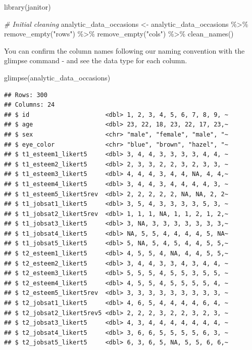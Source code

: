 \documentclass[
]{krantz}
\makeatletter
\newenvironment{Shaded}{\begin{snugshade}}{\end{snugshade}}
\newcommand{\CommentTok}[1]{\textcolor[rgb]{0.37,0.37,0.37}{\textit{#1}}}
\newcommand{\FunctionTok}[1]{\textcolor[rgb]{0,0,0}{#1}}
\newcommand{\NormalTok}[1]{#1}
\newcommand{\OtherTok}[1]{\textcolor[rgb]{0.37,0.37,0.37}{#1}}
\newcommand{\SpecialCharTok}[1]{\textcolor[rgb]{0,0,0}{#1}}
\newcommand{\StringTok}[1]{\textcolor[rgb]{0.5,0.5,0.5}{#1}}
\newenvironment{kframe}{%
\medskip{}
\setlength{\fboxsep}{.8em}
 \def\at@end@of@kframe{}%
 \ifinner\ifhmode%
  \def\at@end@of@kframe{\end{minipage}}%
  \begin{minipage}{\columnwidth}%
 \fi\fi%
 \def\FrameCommand##1{\hskip\@totalleftmargin \hskip-\fboxsep
 \colorbox{shadecolor}{##1}\hskip-\fboxsep
     \hskip-\linewidth \hskip-\@totalleftmargin \hskip\columnwidth}%
 \MakeFramed {\advance\hsize-\width
   \@totalleftmargin\z@ \linewidth\hsize
   \@setminipage}}%
 {\par\unskip\endMakeFramed%
 \at@end@of@kframe}
\renewenvironment{Shaded}{\begin{kframe}}{\end{kframe}}
\makeatother
\begin{document}
\begin{Shaded}
\begin{Highlighting}[]
\FunctionTok{library}\NormalTok{(janitor)}

\CommentTok{\# Initial cleaning}
\NormalTok{analytic\_data\_occasions }\OtherTok{\textless{}{-}}\NormalTok{ analytic\_data\_occasions }\SpecialCharTok{\%\textgreater{}\%}
  \FunctionTok{remove\_empty}\NormalTok{(}\StringTok{"rows"}\NormalTok{) }\SpecialCharTok{\%\textgreater{}\%}
  \FunctionTok{remove\_empty}\NormalTok{(}\StringTok{"cols"}\NormalTok{) }\SpecialCharTok{\%\textgreater{}\%}
  \FunctionTok{clean\_names}\NormalTok{()}
\end{Highlighting}
\end{Shaded}

You can confirm the column names following our naming convention with the glimpse command - and see the data type for each column.

\begin{Shaded}
\begin{Highlighting}[]
\FunctionTok{glimpse}\NormalTok{(analytic\_data\_occasions)}
\end{Highlighting}
\end{Shaded}

\begin{verbatim}
## Rows: 300
## Columns: 24
## $ id                     <dbl> 1, 2, 3, 4, 5, 6, 7, 8, 9, ~
## $ age                    <dbl> 23, 22, 18, 23, 22, 17, 23,~
## $ sex                    <chr> "male", "female", "male", "~
## $ eye_color              <chr> "blue", "brown", "hazel", "~
## $ t1_esteem1_likert5     <dbl> 3, 4, 4, 3, 3, 3, 3, 4, 4, ~
## $ t1_esteem2_likert5     <dbl> 2, 3, 3, 2, 2, 3, 2, 3, 3, ~
## $ t1_esteem3_likert5     <dbl> 4, 4, 4, 3, 4, 4, NA, 4, 4,~
## $ t1_esteem4_likert5     <dbl> 3, 4, 4, 3, 4, 4, 4, 4, 3, ~
## $ t1_esteem5_likert5rev  <dbl> 2, 2, 2, 2, 2, NA, NA, 2, 2~
## $ t1_jobsat1_likert5     <dbl> 3, 5, 4, 3, 3, 3, 3, 5, 3, ~
## $ t1_jobsat2_likert5rev  <dbl> 1, 1, 1, NA, 1, 1, 2, 1, 2,~
## $ t1_jobsat3_likert5     <dbl> 3, NA, 3, 3, 3, 3, 3, 3, 3,~
## $ t1_jobsat4_likert5     <dbl> NA, 5, 5, 4, 4, 4, 4, 5, NA~
## $ t1_jobsat5_likert5     <dbl> 5, NA, 5, 4, 5, 4, 4, 5, 5,~
## $ t2_esteem1_likert5     <dbl> 4, 5, 5, 4, NA, 4, 4, 5, 5,~
## $ t2_esteem2_likert5     <dbl> 3, 4, 4, 3, 3, 4, 3, 4, 4, ~
## $ t2_esteem3_likert5     <dbl> 5, 5, 5, 4, 5, 5, 3, 5, 5, ~
## $ t2_esteem4_likert5     <dbl> 4, 5, 5, 4, 5, 5, 5, 5, 4, ~
## $ t2_esteem5_likert5rev  <dbl> 3, 3, 3, 3, 3, 3, 3, 3, 3, ~
## $ t2_jobsat1_likert5     <dbl> 4, 6, 5, 4, 4, 4, 4, 6, 4, ~
## $ t2_jobsat2_likert5rev5 <dbl> 2, 2, 2, 3, 2, 2, 3, 2, 3, ~
## $ t2_jobsat3_likert5     <dbl> 4, 3, 4, 4, 4, 4, 4, 4, 4, ~
## $ t2_jobsat4_likert5     <dbl> 3, 6, 6, 5, 5, 5, 5, 6, 3, ~
## $ t2_jobsat5_likert5     <dbl> 6, 3, 6, 5, NA, 5, 5, 6, 6,~
\end{verbatim}
\end{document}
